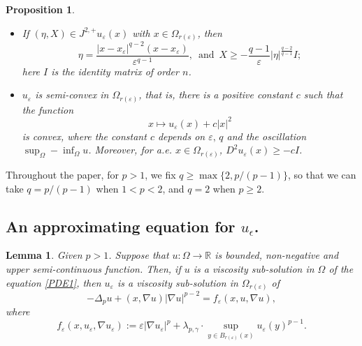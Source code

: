 \documentclass[12pt]{amsart}
\newtheorem{proposition}[theorem]{Proposition}
\newtheorem{lemma}[theorem]{Lemma}
\newcommand{\R}{\mathbb R}
\newcommand{\1}{\mathbf 1}
\begin{document}
\begin{proposition}
\begin{itemize}
  \item If $(\eta,X)\in J^{2,+} u_\varepsilon(x)$ with $x\in \Omega_{r(\varepsilon)}$, then
  \[
  \eta=\frac{|x-x_\varepsilon|^{q-2}(x-x_\varepsilon)}{\varepsilon^{q-1}},\ \mathop{and}\ X \geq - \frac{q-1}{\varepsilon}|\eta|^{\frac{q-2}{q-1}} I;
  \]
 here $I$ is the identity matrix of order $n$.
  \item $u_\varepsilon $ is semi-convex in $\Omega_{r(\varepsilon)}$, that is, there is a positive constant $c$ such that the function
  \[
  x\mapsto u_\varepsilon (x)+c|x|^2
  \]
  is convex, where the constant $c$ depends on $\varepsilon,\,q$ and the oscillation $\sup_{\Omega}-\inf_{\Omega} u$. Moreover, for a.e. $x\in \Omega_{r(\varepsilon)}$, $D^2 u_\varepsilon(x) \geq -cI$.
\end{itemize}
\end{proposition}

Throughout the paper, for $p>1$, we fix $q\geq \max\{2,p/{(p-1)}\}$, so that we can take $q=p/{(p-1)}$ when $1<p<2$, and $q=2$ when $p\geq 2$.


\subsection{An approximating equation for $u_\epsilon$.}
\begin{lemma}\label{Viscosity1}
Given $p>1$. Suppose that $u:\Omega \rightarrow \R$ is bounded, non-negative and upper semi-continuous function. Then, if $u$ is a viscosity sub-solution in $\Omega$ of the equation \eqref{PDE1}, then $u_\varepsilon$ is a viscosity sub-solution in $ \Omega_{r(\varepsilon)}$ of
\begin{equation}\label{viscosity-super-solution}
 -\Delta_p u +(x,\nabla u)|\nabla u|^{p-2}= f_\varepsilon(x,u,\nabla u),
\end{equation}
where
\begin{equation}\label{3-1}
f_\varepsilon(x,u_\varepsilon,\nabla u_\varepsilon):=\varepsilon |\nabla u_\varepsilon|^{p}+\lambda_{p,\gamma}\cdot{\sup}_{y\in B_{r(\varepsilon)}(x)} u_\varepsilon(y)^{p-1}.
\end{equation}
\end{lemma}
\end{document}
